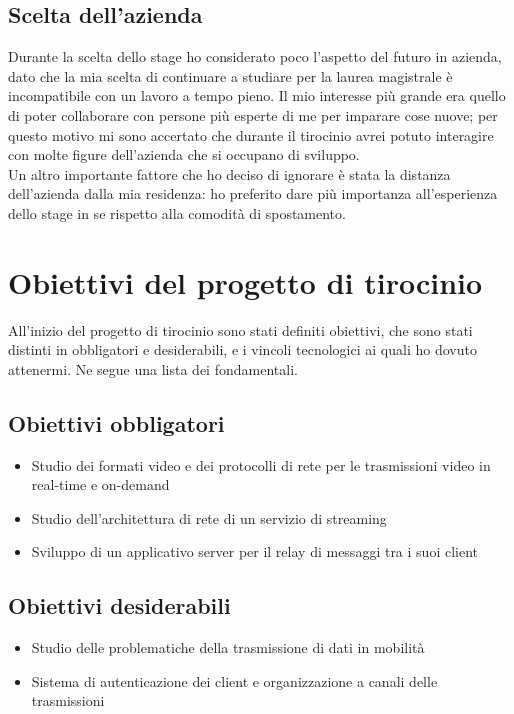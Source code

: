    \subsection{Scelta dell'azienda}
   Durante la scelta dello stage ho considerato poco l'aspetto del futuro in azienda, dato che la mia scelta di continuare a studiare per la laurea magistrale è incompatibile con un lavoro a tempo pieno. Il mio interesse più grande era quello di poter collaborare con persone più esperte di me per imparare cose nuove; per questo motivo mi sono accertato che durante il tirocinio avrei potuto interagire con molte figure dell'azienda che si occupano di sviluppo.
   \\
   Un altro importante fattore che ho deciso di ignorare è stata la distanza dell'azienda dalla mia residenza: ho preferito dare più importanza all'esperienza dello stage in se rispetto alla comodità di spostamento.

\section{Obiettivi del progetto di tirocinio}
All'inizio del progetto di tirocinio sono stati definiti obiettivi, che sono stati distinti in obbligatori e desiderabili, e i vincoli tecnologici ai quali ho dovuto attenermi. Ne segue una lista dei fondamentali.

   \subsection{Obiettivi obbligatori}
   \begin{itemize}
      \item{Studio dei formati video e dei protocolli di rete per le trasmissioni video in real-time e on-demand}
      \item{Studio dell'architettura di rete di un servizio di streaming}
      \item{Sviluppo di un applicativo server per il relay di messaggi tra i suoi client}
   \end{itemize}
      
   \subsection{Obiettivi desiderabili}
   \begin{itemize}
      \item{Studio delle problematiche della trasmissione di dati in mobilità}
      \item{Sistema di autenticazione dei client e organizzazione a canali delle trasmissioni}
   \end{itemize}


